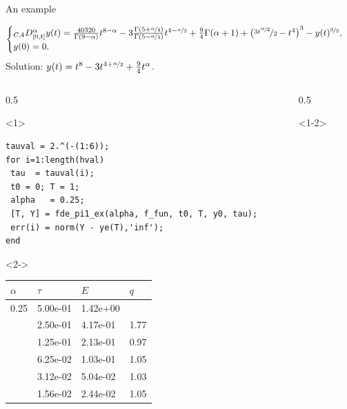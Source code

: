 \documentclass[aspectratio=169,xcolor=dvipsnames]{beamer}
\begin{document}
\begin{frame}[fragile]{An example}

\begin{example}\vspace{-1em}
\begin{equation*}
\begin{cases}
{}_{CA}D^\alpha_{[0,t]} y(t) = \frac{40320}{\Gamma(9-\alpha)} t^{8-\alpha} - 3 \frac{\Gamma(5 + \nicefrac{\alpha}{2})}{\Gamma(5-\nicefrac{\alpha}{2})} t^{4-\nicefrac{\alpha}{2}} + \frac{9}{4}\Gamma(\alpha+1) + \left( \nicefrac{3t^{\nicefrac{\alpha}{2}}}{2} - t^4 \right)^3 - y(t)^{\nicefrac{3}{2}},\\
y(0) = 0.
\end{cases}
\end{equation*}\vspace{-0.5em}
Solution: $y(t) = t^8 - 3 t^{4 + \nicefrac{\alpha}{2}} + \frac{9}{4}t^\alpha$.
\end{example}
\begin{columns}
\begin{column}{0.5\columnwidth}
\begin{onlyenv}<1>
\begin{verbatim}
tauval = 2.^(-(1:6));
for i=1:length(hval)
 tau  = tauval(i);
 t0 = 0; T = 1;
 alpha   = 0.25;
 [T, Y] = fde_pi1_ex(alpha, f_fun, t0, T, y0, tau);
 err(i) = norm(Y - ye(T),'inf');
end
\end{verbatim}
\end{onlyenv}
\begin{onlyenv}<2->
\begin{tabular}{llll}
\toprule
$\alpha$ & $\tau$ & $E$ & $q$ \\
\midrule
0.25 & 5.00e-01 & 1.42e+00 & \\
& 2.50e-01 & 4.17e-01 & 1.77 \\
& 1.25e-01 & 2.13e-01 & 0.97 \\
& 6.25e-02 & 1.03e-01 & 1.05 \\
& 3.12e-02 & 5.04e-02 & 1.03 \\
& 1.56e-02 & 2.44e-02 & 1.05 \\
\bottomrule
\end{tabular}
\end{onlyenv}
\end{column}
\begin{column}{0.5\columnwidth}
\begin{onlyenv}<1-2>{
\centering

}
\end{onlyenv}
\end{column}
\end{columns}
\end{frame}
\end{document}
